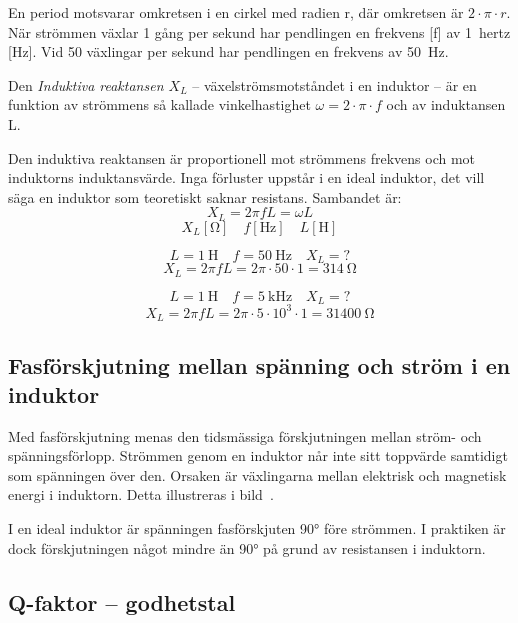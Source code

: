 En period motsvarar omkretsen i en cirkel med radien r, där omkretsen är
\(2 \cdot \pi  \cdot r\). När strömmen växlar 1 gång per sekund har
pendlingen en frekvens [f] av 1~hertz [Hz].
Vid 50 växlingar per sekund har pendlingen en frekvens av \qty{50}{\hertz}.

Den \emph{Induktiva reaktansen \(X_L\)} -- växelströmsmotståndet i en induktor
-- är en funktion av strömmens så kallade vinkelhastighet
\(\omega = 2 \cdot \pi  \cdot f\) och av induktansen L.

Den induktiva reaktansen är proportionell mot strömmens frekvens och mot
induktorns induktansvärde.
Inga förluster uppstår i en ideal induktor, det vill säga en induktor som
teoretiskt saknar resistans.
Sambandet är:
\[X_L = 2\pi fL = \omega L\]
\[X_L [\unit{\ohm}] \quad f [\unit{\hertz}] \quad L [\unit{\henry}]\]
\begin{exempelbox}
\noindent
\[L = \qty{1}{\henry} \quad f = \qty{50}{\hertz} \quad X_L = ?\]
\tcblower
\noindent
\[X_L = 2\pi fL = 2\pi \cdot 50 \cdot 1 = \qty{314}{\ohm}\]
\end{exempelbox}

\begin{exempelbox}
\noindent
\[L = \qty{1}{\henry} \quad f = \qty{5}{\kilo\hertz} \quad X_L = ?\]
\tcblower
\noindent
\[X_L = 2\pi fL = 2\pi  \cdot 5 \cdot 10^3 \cdot 1 = \qty{31400}{\ohm}\]
\end{exempelbox}

\subsection{Fasförskjutning mellan spänning och ström i en induktor}

Med fasförskjutning menas den tidsmässiga förskjutningen mellan ström- och
spänningsförlopp.
Strömmen genom en induktor når inte sitt toppvärde samtidigt
som spänningen över den.
Orsaken är växlingarna mellan elektrisk och magnetisk energi i induktorn.
Detta illustreras i bild~.

I en ideal induktor är spänningen fasförskjuten \ang{90} före strömmen.
I praktiken är dock förskjutningen något mindre än \ang{90} på grund av
resistansen i induktorn.

\subsection{Q-faktor -- godhetstal}

